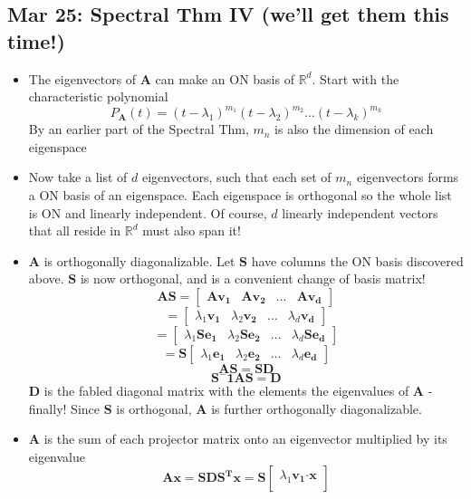 \documentclass[10pt, oneside]{article}
\newcommand{\R}{\mathbb{R}}
\newcommand{\Cdot}{\boldsymbol{\cdot}}
\renewcommand{\vec}[1]{\mathbf{#1}}
\newcommand{\mat}[1]{\mathbf{#1}}
\begin{document}
\subsection{Mar 25: Spectral Thm IV (we'll get them this time!)}
\begin{itemize}
    \item The eigenvectors of $\mat{A}$ can make an ON basis of $\R^d$. Start with the characteristic polynomial
            \[P_\mat{A}(t) = (t-\lambda_1)^{m_1}(t-\lambda_2)^{m_2}\hdots(t-\lambda_k)^{m_k}\]
        By an earlier part of the Spectral Thm, $m_n$ is also the dimension of each eigenspace
    \item Now take a list of $d$ eigenvectors, such that each set of $m_n$ eigenvectors forms a ON basis of an eigenspace. Each eigenspace is orthogonal so the whole list is ON and linearly independent. Of course, $d$ linearly independent vectors that all reside in $\R^d$ must also span it!
    \item $\mat{A}$ is orthogonally diagonalizable. Let $\mat{S}$ have columns the ON basis discovered above. $\mat{S}$ is now orthogonal, and is a convenient change of basis matrix!
            \[\mat{A}\mat{S} = \begin{bmatrix} \mat{A}\vec{v_1} & \mat{A}\vec{v_2} & \hdots & \mat{A}\vec{v_d} \end{bmatrix}\]
            \[= \begin{bmatrix} \lambda_1\vec{v_1} & \lambda_2\vec{v_2} & \hdots & \lambda_d\vec{v_d} \end{bmatrix}\]
            \[= \begin{bmatrix} \lambda_1\mat{S}\vec{e_1} & \lambda_2\mat{S}\vec{e_2} & \hdots & \lambda_d\mat{S}\vec{e_d} \end{bmatrix}\]
            \[= \mat{S} \begin{bmatrix} \lambda_1\vec{e_1} & \lambda_2\vec{e_2} & \hdots & \lambda_d\vec{e_d} \end{bmatrix}\]
            \[\mat{A}\mat{S} = \mat{S}\mat{D}\]
            \[\mat{S^-1}\mat{A}\mat{S} = \mat{D}\]
        $\mat{D}$ is the fabled diagonal matrix with the elements the eigenvalues of $\mat{A}$ - finally! Since $\mat{S}$ is orthogonal, $\mat{A}$ is further orthogonally diagonalizable.
    \item $\mat{A}$ is the sum of each projector matrix onto an eigenvector multiplied by its eigenvalue
            \[\mat{A}\vec{x} = \mat{S}\mat{D}\mat{S^T}\vec{x} = \mat{S} \begin{bmatrix}
                \lambda_1 \vec{v_1}\Cdot\vec{x}\\

\end{bmatrix}\]
\end{itemize}
\end{document}
